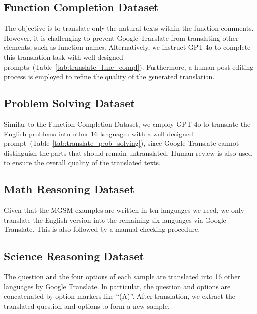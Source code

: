 \subsection{Function Completion Dataset}
The objective is to translate only the natural texts within the function comments.
However, it is challenging to prevent Google Translate from translating other elements, such as function names.
Alternatively, we instruct GPT-4o to complete this translation task with well-designed prompts~(Table~\ref{tab:translate_func_compl}).
Furthermore, a human post-editing process is employed to refine the quality of the generated translation.

\subsection{Problem Solving Dataset}
Similar to the Function Completion Dataset, we employ GPT-4o to translate the English problems into other 16 languages with a well-designed prompt~(Table~\ref{tab:translate_prob_solving}), since Google Translate cannot distinguish the parts that should remain untranslated.
Human review is also used to ensure the overall quality of the translated texts.

\subsection{Math Reasoning Dataset}
Given that the MGSM examples are written in ten languages we need, we only translate the English version into the remaining six languages via Google Translate.
This is also followed by a manual checking procedure.

\subsection{Science Reasoning Dataset}
The question and the four options of each sample are translated into 16 other languages by Google Translate.
In particular, the question and options are concatenated by option markers like ``(A)''.
After translation, we extract the translated question and options to form a new sample.

